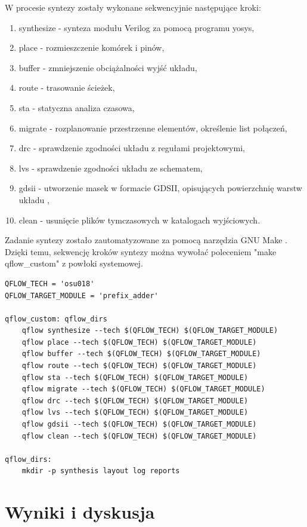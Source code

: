 \documentclass[12pt,oneside,reqno]{article}
\begin{document}
W procesie syntezy zostały wykonane sekwencyjnie następujące kroki:
\begin{enumerate}
    \item synthesize - synteza modułu Verilog za pomocą programu yosys,
    \item place - rozmieszczenie komórek i pinów,
    \item buffer - zmniejszenie obciążalności wyjść układu,
    \item route - trasowanie ścieżek,
    \item sta - statyczna analiza czasowa,
    \item migrate - rozplanowanie przestrzenne elementów, określenie list połączeń,
    \item drc - sprawdzenie zgodności układu z regułami projektowymi,
    \item lvs - sprawdzenie zgodności układu ze schematem,
    \item gdsii - utworzenie masek w formacie GDSII, opisujących powierzchnię warstw układu \cite{gdsii},
    \item clean - usunięcie plików tymczasowych w katalogach wyjściowych.
\end{enumerate}

\clearpage
Zadanie syntezy zostało zautomatyzowane za pomocą narzędzia GNU Make \cite{gnumake}. Dzięki temu, sekwencję kroków syntezy można wywołać poleceniem "make qflow\_custom" z powłoki systemowej.

\begin{lstlisting}[caption={Fragment pliku Makefile, realizujący syntezę modułu prefix\_adder.}, label={lst:makefile-qflow}]
QFLOW_TECH = 'osu018'
QFLOW_TARGET_MODULE = 'prefix_adder'

qflow_custom: qflow_dirs
	qflow synthesize --tech $(QFLOW_TECH) $(QFLOW_TARGET_MODULE)
	qflow place --tech $(QFLOW_TECH) $(QFLOW_TARGET_MODULE)
	qflow buffer --tech $(QFLOW_TECH) $(QFLOW_TARGET_MODULE)
	qflow route --tech $(QFLOW_TECH) $(QFLOW_TARGET_MODULE)
	qflow sta --tech $(QFLOW_TECH) $(QFLOW_TARGET_MODULE)
	qflow migrate --tech $(QFLOW_TECH) $(QFLOW_TARGET_MODULE)
	qflow drc --tech $(QFLOW_TECH) $(QFLOW_TARGET_MODULE)
	qflow lvs --tech $(QFLOW_TECH) $(QFLOW_TARGET_MODULE)
	qflow gdsii --tech $(QFLOW_TECH) $(QFLOW_TARGET_MODULE)
	qflow clean --tech $(QFLOW_TECH) $(QFLOW_TARGET_MODULE)
	
qflow_dirs:
	mkdir -p synthesis layout log reports
\end{lstlisting}

\section{Wyniki i dyskusja}
\end{document}
